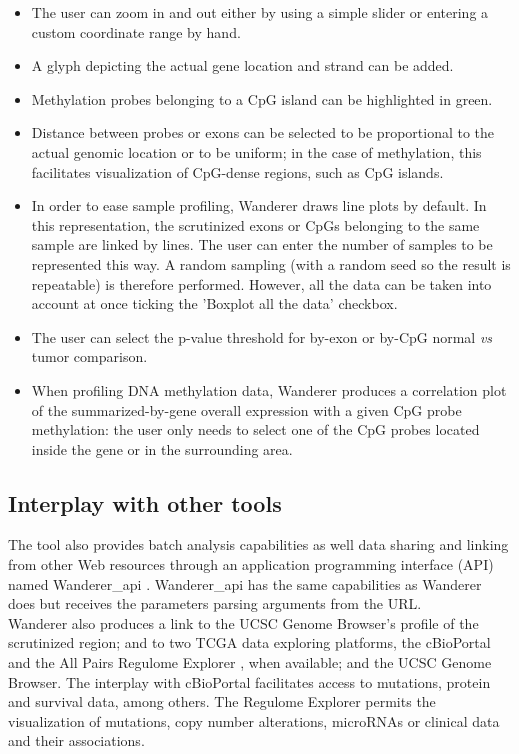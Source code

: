 \documentclass{bmcart}
\begin{document}
\begin{itemize}
\item The user can zoom in and out either by using a simple slider or entering a custom coordinate range by hand. 
\item A glyph depicting the actual gene location and strand can be added. 
\item Methylation probes belonging to a CpG island can be highlighted in green. 
\item Distance between probes or exons can be selected to be proportional to the actual genomic location or to be uniform; in the case of methylation, this facilitates visualization of CpG-dense regions, such as CpG islands. 
\item In order to ease sample profiling, Wanderer draws line plots by default. In this representation, the scrutinized exons or CpGs belonging to the same sample are linked by lines. The user can enter the number of samples to be represented this way. A random sampling (with a random seed so the result is repeatable) is therefore performed. However, all the data can be taken into account at once ticking the 'Boxplot all the data' checkbox.
\item {\color{red} The user can select the p-value threshold for by-exon or by-CpG normal \textit{vs} tumor comparison.}
\item {\color{red} When profiling DNA methylation data, Wanderer produces a correlation plot of the summarized-by-gene overall expression with a given CpG probe methylation: the user only needs to select one of the CpG probes located inside the gene or in the surrounding area.}
\end{itemize}

{\color{red}
\subsection*{Interplay with other tools}

The tool also provides batch analysis capabilities as well data sharing and linking from other Web resources through an application programming interface (API) named Wanderer\_api \cite{wandererapi}. Wanderer\_api has the same capabilities as Wanderer does but receives the parameters parsing arguments from the URL.\\ 

Wanderer also produces a link to the UCSC Genome Browser's profile of the scrutinized region; and to two TCGA data exploring platforms, the cBioPortal \cite{gao2013integrative} and the All Pairs Regulome Explorer \cite{cancer2012comprehensive}, when available; {\color{red} and the UCSC Genome Browser}. The interplay with cBioPortal facilitates access to mutations, protein and survival data, among others. The Regulome Explorer permits the visualization of mutations, copy number alterations, microRNAs or clinical data and their associations.}
\end{document}
